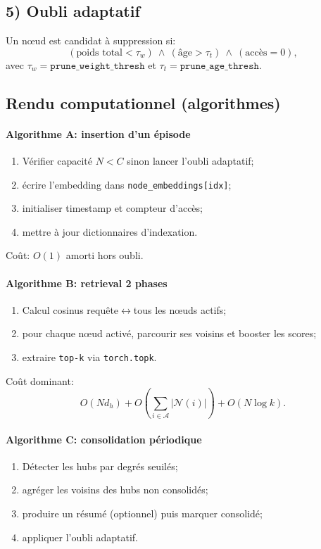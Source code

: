 \documentclass[12pt,a4paper]{article}
\begin{document}
\subsection{5) Oubli adaptatif}
Un n\oe ud est candidat à suppression si:
\begin{equation}
(\text{poids total} < \tau_w)\ \land\ (\text{âge} > \tau_t)\ \land\ (\text{accès} = 0),
\end{equation}
avec $\tau_w=\texttt{prune\_weight\_thresh}$ et $\tau_t=\texttt{prune\_age\_thresh}$.

\subsection{Rendu computationnel (algorithmes)}
\paragraph{Algorithme A: insertion d'un épisode}
\begin{enumerate}[leftmargin=*]
    \item Vérifier capacité $N<C$ sinon lancer l'oubli adaptatif;
    \item écrire l'embedding dans \texttt{node\_embeddings[idx]};
    \item initialiser timestamp et compteur d'accès;
    \item mettre à jour dictionnaires d'indexation.
\end{enumerate}
Coût: $O(1)$ amorti hors oubli.

\paragraph{Algorithme B: retrieval 2 phases}
\begin{enumerate}[leftmargin=*]
    \item Calcul cosinus requête$\leftrightarrow$tous les n\oe uds actifs;
    \item pour chaque n\oe ud activé, parcourir ses voisins et booster les scores;
    \item extraire \texttt{top-k} via \texttt{torch.topk}.
\end{enumerate}
Coût dominant:
\begin{equation}
O(Nd_h) + O\!\left(\sum_{i \in \mathcal{A}} |\mathcal{N}(i)|\right) + O(N \log k).
\end{equation}

\paragraph{Algorithme C: consolidation périodique}
\begin{enumerate}[leftmargin=*]
    \item Détecter les hubs par degrés seuilés;
    \item agréger les voisins des hubs non consolidés;
    \item produire un résumé (optionnel) puis marquer consolidé;
    \item appliquer l'oubli adaptatif.
\end{enumerate}
\end{document}
